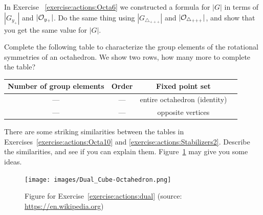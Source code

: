 \begin{exercise}\label{exercise:actions:Octa9}
In Exercise ~\ref{exercise:actions:Octa6} we constructed a formula for $|G|$ in terms of $|G_{y_+}|$ and $|{\cal O}_{y_+}|$. Do the same thing using $|G_{\triangle_{+ + +}}|$ and $|{\cal O}_{\triangle_{+ + +}}|$, and show that you get the same value for $|G|$.
\end{exercise}

\begin{exercise}\label{exercise:actions:Octa10}
Complete the following table to characterize the group elements of the rotational symmetries of an octahedron.  We show two rows, how many more to complete the table? 
 
\begin{tabular}{| c |c|c| r |} \hline
 \textbf{ Number of group elements} & \textbf{Order} & \textbf{Fixed point set} \\ \hline
  ---&  ---& entire  octahedron (identity) \\ \hline
  --- & ---&  opposite vertices \\

\end{tabular}
\end{exercise}

\begin{exercise}\label{exercise:actions:dual}
There are some striking similarities between the tables in Exercises~\ref{exercise:actions:Octa10} and \ref{exercise:actions:Stabilizers2}. Describe the similarities, and see if you can explain them. Figure~\ref{fig:Dual} may give you some ideas.
\end{exercise}

\begin{figure}[ht]
\begin{center}
\texttt{[image: images/Dual\_Cube-Octahedron.png]}
\caption{\label{fig:Dual}Figure for Exercise~\ref{exercise:actions:dual} (source: \url{https://en.wikipedia.org})}

\end{center}
\end{figure}

